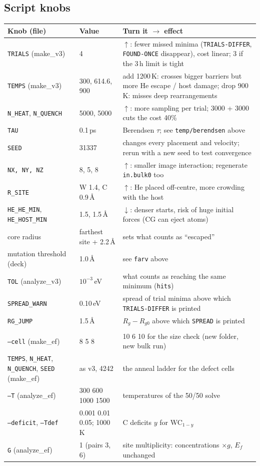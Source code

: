 \documentclass[10pt]{article}
\newcommand{\cmd}[1]{\texttt{\small #1}}
\newcommand{\up}{\textcolor{org}{$\uparrow$}}
\newcommand{\dn}{\textcolor{acc}{$\downarrow$}}
\begin{document}
\subsection*{Script knobs}
\begin{xltabular}{\linewidth}{L{3.4cm} L{2.4cm} Y}
\toprule
\textbf{Knob (file)} & \textbf{Value} & \textbf{Turn it $\to$ effect} \\
\midrule\endhead
\cmd{TRIALS} (make\_v3) & 4 & \up: fewer missed minima (\cmd{TRIALS-DIFFER}, \cmd{FOUND-ONCE} disappear), cost linear; 3 if the 3\,h limit is tight \\
\cmd{TEMPS} (make\_v3) & 300, 614.6, 900 & add 1200\,K: crosses bigger barriers but more He escape / host damage; drop 900\,K: misses deep rearrangements \\
\cmd{N\_HEAT}, \cmd{N\_QUENCH} & 5000, 5000 & \up: more sampling per trial; 3000 + 3000 cuts the cost 40\% \\
\cmd{TAU} & 0.1\,ps & Berendsen $\tau$; see \cmd{temp/berendsen} above \\
\cmd{SEED} & 31337 & changes every placement and velocity; rerun with a new seed to test convergence \\
\cmd{NX, NY, NZ} & 8, 5, 8 & \up: smaller image interaction; regenerate \cmd{in.bulk0} too \\
\cmd{R\_SITE} & W 1.4, C 0.9\,\AA & \up: He placed off-centre, more crowding with the host \\
\cmd{HE\_HE\_MIN}, \cmd{HE\_HOST\_MIN} & 1.5, 1.5\,\AA & \dn: denser starts, risk of huge initial forces (CG can eject atoms) \\
core radius & farthest site + 2.2\,\AA & sets what counts as ``escaped'' \\
mutation threshold (deck) & 1.0\,\AA & see \cmd{farv} above \\
\cmd{TOL} (analyze\_v3) & $10^{-3}$\,eV & what counts as reaching the same minimum (\cmd{hits}) \\
\cmd{SPREAD\_WARN} & 0.10\,eV & spread of trial minima above which \cmd{TRIALS-DIFFER} is printed \\
\cmd{RG\_JUMP} & 1.5\,\AA & $R_g-R_{g0}$ above which \cmd{SPREAD} is printed \\
 \\
\cmd{--cell} (make\_ef) & 8 5 8 & 10 6 10 for the size check (new folder, new bulk run) \\
\cmd{TEMPS}, \cmd{N\_HEAT}, \cmd{N\_QUENCH}, \cmd{SEED} (make\_ef) & as v3, 4242 & the anneal ladder for the defect cells \\
\cmd{--T} (analyze\_ef) & 300 600 1000 1500 & temperatures of the 50/50 solve \\
\cmd{--deficit}, \cmd{--Tdef} & 0.001 0.01 0.05; 1000\,K & C deficits $y$ for WC$_{1-y}$ \\
\cmd{G} (analyze\_ef) & 1 (pairs 3, 6) & site multiplicity: concentrations $\times g$, $E_f$ unchanged \\
\bottomrule
\end{xltabular}
\end{document}
